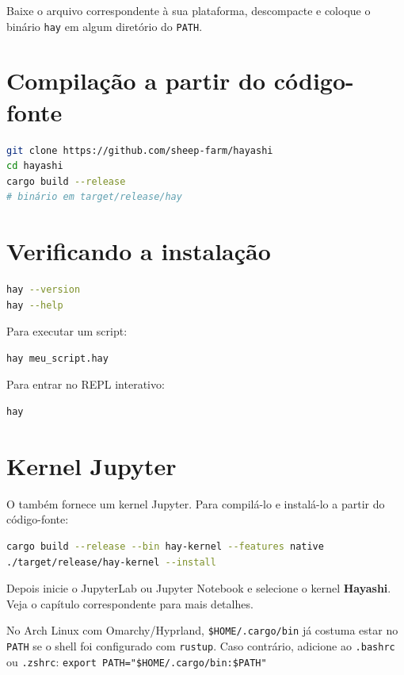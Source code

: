 Baixe o arquivo correspondente à sua plataforma, descompacte e coloque o binário
\texttt{hay} em algum diretório do \texttt{PATH}.

\section{Compilação a partir do código-fonte}

\begin{lstlisting}[style=inline, language=sh]
git clone https://github.com/sheep-farm/hayashi
cd hayashi
cargo build --release
# binário em target/release/hay
\end{lstlisting}

\section{Verificando a instalação}

\begin{lstlisting}[style=inline, language=sh]
hay --version
hay --help
\end{lstlisting}

Para executar um script:

\begin{lstlisting}[style=inline, language=sh]
hay meu_script.hay
\end{lstlisting}

Para entrar no REPL interativo:

\begin{lstlisting}[style=inline, language=sh]
hay
\end{lstlisting}

\section{Kernel Jupyter}

O \hayashi{} também fornece um kernel Jupyter. Para compilá-lo e instalá-lo a
partir do código-fonte:

\begin{lstlisting}[style=inline, language=sh]
cargo build --release --bin hay-kernel --features native
./target/release/hay-kernel --install
\end{lstlisting}

Depois inicie o JupyterLab ou Jupyter Notebook e selecione o kernel
\textbf{Hayashi}. Veja o capítulo correspondente para mais detalhes.

\begin{nota}
  No Arch Linux com Omarchy/Hyprland, \texttt{\$HOME/.cargo/bin} já costuma estar no
  \texttt{PATH} se o shell foi configurado com \texttt{rustup}. Caso contrário, adicione
  ao \texttt{.bashrc} ou \texttt{.zshrc}:
  \texttt{export PATH="\$HOME/.cargo/bin:\$PATH"}
\end{nota}
